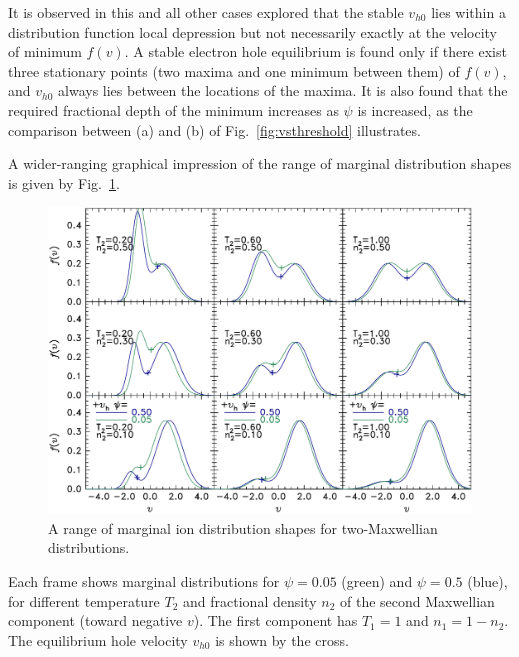 \documentclass[12pt]{article}
\begin{document}
It is observed in this and all other cases explored that the stable
$v_{h0}$ lies within a distribution function local depression but not
necessarily exactly at the velocity of minimum $f(v)$.
A stable electron hole equilibrium is found only if there exist three
stationary points (two maxima and one minimum between them) of $f(v)$,
and $v_{h0}$ always lies between the locations of the maxima. It is
also found that the required fractional depth of the minimum increases
as $\psi$ is increased, as the comparison between (a) and (b) of Fig.\
\ref{fig:vsthreshold} illustrates.

A wider-ranging graphical impression of the range of marginal
distribution shapes is given by Fig.\ \ref{fig:shapes}.
\begin{figure}[htp]
  \centering
  \includegraphics[width=.8\hsize]{shapes}
  \caption{A range of marginal ion distribution shapes for two-Maxwellian
    distributions.}
  \label{fig:shapes}
\end{figure}
Each frame shows marginal distributions for $\psi=0.05$ (green) and
$\psi=0.5$ (blue), for different temperature $T_2$ and fractional
density $n_2$ of the second Maxwellian component (toward negative
$v$). The first component has $T_1=1$ and $n_1=1-n_2$. The equilibrium hole
velocity $v_{h0}$ is shown by the cross.
\end{document}
